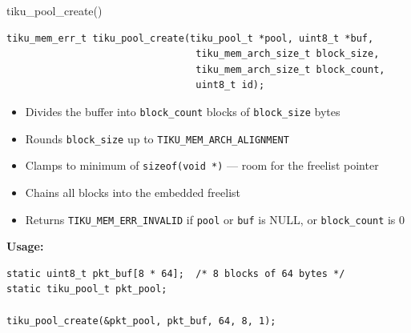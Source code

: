 \documentclass[aspectratio=169, 10pt]{beamer}
\begin{document}
\begin{frame}[fragile]{tiku\_pool\_create()}
\begin{lstlisting}[style=cstyle]
tiku_mem_err_t tiku_pool_create(tiku_pool_t *pool, uint8_t *buf,
                                 tiku_mem_arch_size_t block_size,
                                 tiku_mem_arch_size_t block_count,
                                 uint8_t id);
\end{lstlisting}

\begin{itemize}
  \item Divides the buffer into \texttt{block\_count} blocks of \texttt{block\_size} bytes
  \item Rounds \texttt{block\_size} up to \texttt{TIKU\_MEM\_ARCH\_ALIGNMENT}
  \item Clamps to minimum of \texttt{sizeof(void *)} --- room for the freelist pointer
  \item Chains all blocks into the embedded freelist
  \item Returns \texttt{TIKU\_MEM\_ERR\_INVALID} if \texttt{pool} or \texttt{buf} is NULL, or \texttt{block\_count} is 0
\end{itemize}

\vspace{0.3em}
\textbf{Usage:}
\begin{lstlisting}[style=cstyle]
static uint8_t pkt_buf[8 * 64];  /* 8 blocks of 64 bytes */
static tiku_pool_t pkt_pool;

tiku_pool_create(&pkt_pool, pkt_buf, 64, 8, 1);
\end{lstlisting}
\end{frame}
\end{document}
